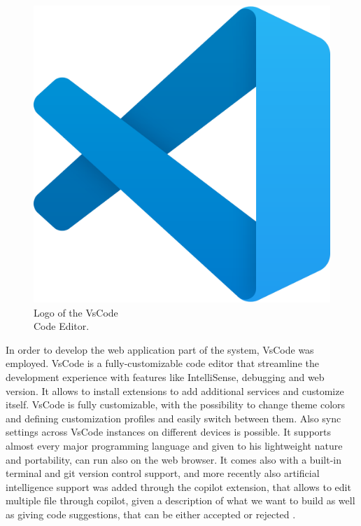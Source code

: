 \begin{figure} %
    \captionsetup{font=footnotesize}
    \centering
    \includegraphics[width=\linewidth]{images/vs_code.png}
    \caption{Logo of the VsCode\\Code Editor.}
\end{figure}

In order to develop the web application part of the system, VsCode was employed. VsCode is a fully-customizable code editor that streamline the development experience with features like IntelliSense, debugging and web version. It allows to install extensions to add additional services and customize itself. VsCode is fully customizable, with the possibility to change theme colors and defining customization profiles and easily switch between them. Also sync settings across VsCode instances on different devices is possible. It supports almost every major programming language and given to his lightweight nature and portability, can run also on the web browser. It comes also with a built-in terminal and git version control support, and more recently also artificial intelligence support was added through the copilot extension, that allows to edit multiple file through copilot, given a description of what we want to build as well as giving code suggestions, that can be either accepted or rejected \cite{VsCode}. 
\newpage
